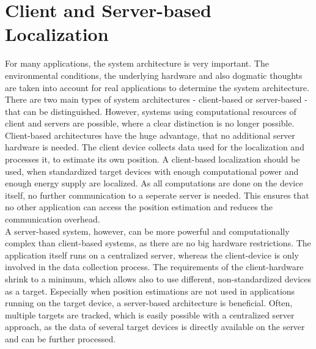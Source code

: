 \section{Client and Server-based Localization}
For many applications, the system architecture is very important. The environmental conditions, the underlying hardware and also dogmatic thoughts are taken into account for real applications to determine the system architecture. There are two main types of system architectures - client-based or server-based - that can be distinguished. However, systems using computational resources of client and servers are possible, where a clear distinction is no longer possible.\\
\noindent\hspace*{5mm}%
Client-based architectures have the huge advantage, that no additional server hardware is needed. The client device collects data used for the localization and processes it, to estimate its own position. A client-based localization should be used, when standardized target devices with enough computational power and enough energy supply are localized. As all computations are done on the device itself, no further communication to a seperate server is needed. This ensures that no other application can access the position estimation and reduces the communication overhead.\\
\noindent\hspace*{5mm}%
A server-based system, however, can be more powerful and computationally complex than client-based systems, as there are no big hardware restrictions. The application itself runs on a centralized server, whereas the client-device is only involved in the data collection process. The requirements of the client-hardware shrink to a minimum, which allows also to use different, non-standardized devices as a target. Especially when position estimations are not used in applications running on the target device, a server-based architecture is beneficial. Often, multiple targets are tracked, which is easily possible with a centralized server approach, as the data of several target devices is directly available on the server and can be further processed. 


